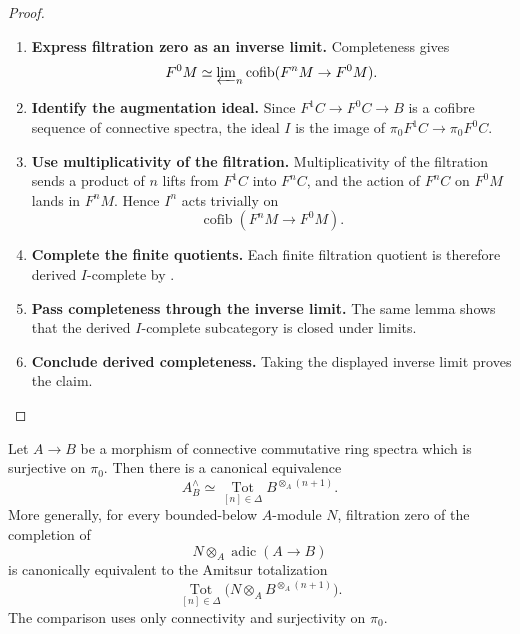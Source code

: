 \begin{proof}
\leavevmode
\begin{enumerate}[label=\textup{(\arabic*)}]
    \item \textbf{Express filtration zero as an inverse limit.}
    Completeness gives
    \[
        F^0M\simeq
        \varprojlim\nolimits_n\operatorname{cofib}(F^nM\to F^0M).
    \]
    \item \textbf{Identify the augmentation ideal.}
    Since \(F^1C\to F^0C\to B\) is a cofibre sequence of connective spectra, the
    ideal \(I\) is the image of \(\pi_0F^1C\to\pi_0F^0C\).
    \item \textbf{Use multiplicativity of the filtration.}
    Multiplicativity of
    the filtration sends a product of \(n\) lifts from \(F^1C\) into \(F^nC\),
    and the action of \(F^nC\) on \(F^0M\) lands in \(F^nM\). Hence \(I^n\)
    acts trivially on
    \[
        \operatorname{cofib}(F^nM\to F^0M).
    \]
    \item \textbf{Complete the finite quotients.}
    Each finite filtration quotient is therefore derived \(I\)-complete by
    .
    \item \textbf{Pass completeness through the inverse limit.}
    The same lemma shows that the
    derived \(I\)-complete subcategory is closed under limits.
    \item \textbf{Conclude derived completeness.}
    Taking the
    displayed inverse limit proves the claim.
\end{enumerate}
\end{proof}


\begin{theorem}
\label{thm:adic-adams-completion}
Let \(A\to B\) be a morphism of connective commutative ring spectra which is
surjective on \(\pi_0\). Then there is a canonical equivalence
\[
    A_B^\wedge
    \simeq
    \operatorname*{Tot}_{[n]\in\Delta}
    B^{\otimes_A(n+1)}.
\]
More generally, for every bounded-below \(A\)-module \(N\), filtration zero
of the completion of
\[
    N\otimes_A\operatorname{adic}(A\to B)
\]
is canonically equivalent to the Amitsur totalization
\[
    \operatorname*{Tot}_{[n]\in\Delta}
    \bigl(N\otimes_A B^{\otimes_A(n+1)}\bigr).
\]
The comparison uses only connectivity and surjectivity on \(\pi_0\).
\end{theorem}

